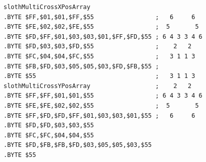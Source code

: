 \begin{minipage}[b]{0.48\linewidth}
\begin{lrbox}{\mybox}%
\begin{lstlisting}[basicstyle=\ttfamily\tiny,escapechar=\%]
slothMultiCrossXPosArray
.BYTE $FF,$01,$01,$FF,$55                 ;   6     6  
.BYTE $FE,$02,$02,$FE,$55                 ;  5       5 
.BYTE $FD,$FF,$01,$03,$03,$01,$FF,$FD,$55 ; 6 4 3 3 4 6
.BYTE $FD,$03,$03,$FD,$55                 ;    2   2   
.BYTE $FC,$04,$04,$FC,$55                 ;   3 1 1 3  
.BYTE $FB,$FD,$03,$05,$05,$03,$FD,$FB,$55 ;            
.BYTE $55                                 ;   3 1 1 3  
slothMultiCrossYPosArray                  ;    2   2   
.BYTE $FF,$FF,$01,$01,$55                 ; 6 4 3 3 4 6
.BYTE $FE,$FE,$02,$02,$55                 ;  5       5 
.BYTE $FF,$FD,$FD,$FF,$01,$03,$03,$01,$55 ;   6     6  
.BYTE $FD,$FD,$03,$03,$55
.BYTE $FC,$FC,$04,$04,$55
.BYTE $FD,$FB,$FB,$FD,$03,$05,$05,$03,$55
.BYTE $55
\end{lstlisting}
\end{lrbox}%
\scalebox{0.8}{\usebox{\mybox}}

\end{minipage}
%
